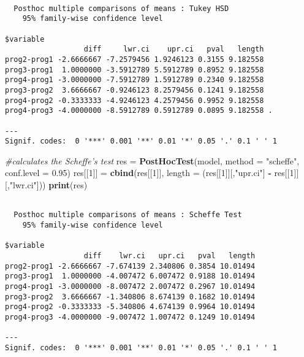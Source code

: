 \documentclass[]{article}
\newenvironment{Shaded}{\begin{snugshade}}{\end{snugshade}}
\newcommand{\KeywordTok}[1]{\textcolor[rgb]{0.13,0.29,0.53}{\textbf{#1}}}
\newcommand{\DataTypeTok}[1]{\textcolor[rgb]{0.13,0.29,0.53}{#1}}
\newcommand{\DecValTok}[1]{\textcolor[rgb]{0.00,0.00,0.81}{#1}}
\newcommand{\FloatTok}[1]{\textcolor[rgb]{0.00,0.00,0.81}{#1}}
\newcommand{\StringTok}[1]{\textcolor[rgb]{0.31,0.60,0.02}{#1}}
\newcommand{\CommentTok}[1]{\textcolor[rgb]{0.56,0.35,0.01}{\textit{#1}}}
\newcommand{\OperatorTok}[1]{\textcolor[rgb]{0.81,0.36,0.00}{\textbf{#1}}}
\newcommand{\NormalTok}[1]{#1}
\begin{document}
\begin{verbatim}

  Posthoc multiple comparisons of means : Tukey HSD 
    95% family-wise confidence level

$variable
                  diff     lwr.ci    upr.ci   pval   length    
prog2-prog1 -2.6666667 -7.2579456 1.9246123 0.3155 9.182558    
prog3-prog1  1.0000000 -3.5912789 5.5912789 0.8952 9.182558    
prog4-prog1 -3.0000000 -7.5912789 1.5912789 0.2340 9.182558    
prog3-prog2  3.6666667 -0.9246123 8.2579456 0.1241 9.182558    
prog4-prog2 -0.3333333 -4.9246123 4.2579456 0.9952 9.182558    
prog4-prog3 -4.0000000 -8.5912789 0.5912789 0.0895 9.182558 .  

---
Signif. codes:  0 '***' 0.001 '**' 0.01 '*' 0.05 '.' 0.1 ' ' 1
\end{verbatim}

\begin{Shaded}
\begin{Highlighting}[]
\CommentTok{#calculates the Scheffe's test}
\NormalTok{res =}\StringTok{ }\KeywordTok{PostHocTest}\NormalTok{(model, }\DataTypeTok{method =} \StringTok{"scheffe"}\NormalTok{, }\DataTypeTok{conf.level =} \FloatTok{0.95}\NormalTok{)  }
\NormalTok{res[[}\DecValTok{1}\NormalTok{]] =}\StringTok{ }\KeywordTok{cbind}\NormalTok{(res[[}\DecValTok{1}\NormalTok{]], }\DataTypeTok{length =}\NormalTok{ (res[[}\DecValTok{1}\NormalTok{]][,}\StringTok{"upr.ci"}\NormalTok{] }\OperatorTok{-}\StringTok{ }\NormalTok{res[[}\DecValTok{1}\NormalTok{]][,}\StringTok{"lwr.ci"}\NormalTok{]))}
\KeywordTok{print}\NormalTok{(res)}
\end{Highlighting}
\end{Shaded}

\begin{verbatim}

  Posthoc multiple comparisons of means : Scheffe Test 
    95% family-wise confidence level

$variable
                  diff    lwr.ci   upr.ci   pval   length    
prog2-prog1 -2.6666667 -7.674139 2.340806 0.3854 10.01494    
prog3-prog1  1.0000000 -4.007472 6.007472 0.9188 10.01494    
prog4-prog1 -3.0000000 -8.007472 2.007472 0.2967 10.01494    
prog3-prog2  3.6666667 -1.340806 8.674139 0.1682 10.01494    
prog4-prog2 -0.3333333 -5.340806 4.674139 0.9964 10.01494    
prog4-prog3 -4.0000000 -9.007472 1.007472 0.1249 10.01494    

---
Signif. codes:  0 '***' 0.001 '**' 0.01 '*' 0.05 '.' 0.1 ' ' 1
\end{verbatim}
\end{document}
